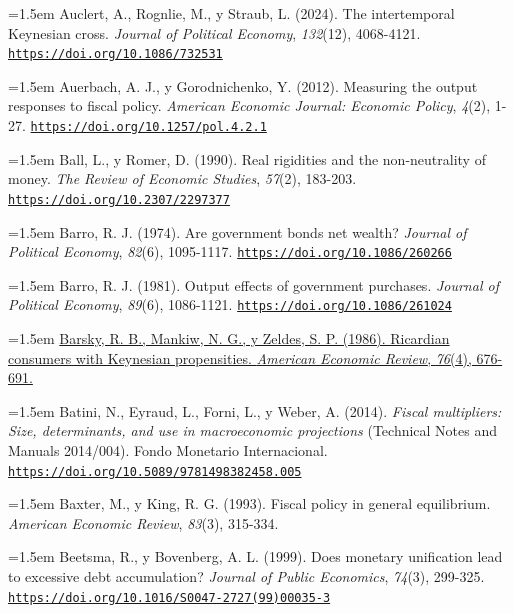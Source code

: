\documentclass[10pt,a4paper]{article}
\begin{document}
\noindent\hangindent=1.5em Auclert, A., Rognlie, M., y Straub, L. (2024). The intertemporal Keynesian cross. \textit{Journal of Political Economy}, \textit{132}(12), 4068-4121. \href{https://doi.org/10.1086/732531}{\nolinkurl{https://doi.org/10.1086/732531}}

\noindent\hangindent=1.5em Auerbach, A. J., y Gorodnichenko, Y. (2012). Measuring the output responses to fiscal policy. \textit{American Economic Journal: Economic Policy}, \textit{4}(2), 1-27. \href{https://doi.org/10.1257/pol.4.2.1}{\nolinkurl{https://doi.org/10.1257/pol.4.2.1}}

\noindent\hangindent=1.5em Ball, L., y Romer, D. (1990). Real rigidities and the non-neutrality of money. \textit{The Review of Economic Studies}, \textit{57}(2), 183-203. \href{https://doi.org/10.2307/2297377}{\nolinkurl{https://doi.org/10.2307/2297377}}

\noindent\hangindent=1.5em Barro, R. J. (1974). Are government bonds net wealth? \textit{Journal of Political Economy}, \textit{82}(6), 1095-1117. \href{https://doi.org/10.1086/260266}{\nolinkurl{https://doi.org/10.1086/260266}}

\noindent\hangindent=1.5em Barro, R. J. (1981). Output effects of government purchases. \textit{Journal of Political Economy}, \textit{89}(6), 1086-1121. \href{https://doi.org/10.1086/261024}{\nolinkurl{https://doi.org/10.1086/261024}}

\noindent\hangindent=1.5em \href{https://ideas.repec.org/a/aea/aecrev/v76y1986i4p676-91.html}{Barsky, R. B., Mankiw, N. G., y Zeldes, S. P. (1986). Ricardian consumers with Keynesian propensities. \textit{American Economic Review}, \textit{76}(4), 676-691.}

\noindent\hangindent=1.5em Batini, N., Eyraud, L., Forni, L., y Weber, A. (2014). \textit{Fiscal multipliers: Size, determinants, and use in macroeconomic projections} (Technical Notes and Manuals 2014/004). Fondo Monetario Internacional. \href{https://doi.org/10.5089/9781498382458.005}{\nolinkurl{https://doi.org/10.5089/9781498382458.005}}

\noindent\hangindent=1.5em Baxter, M., y King, R. G. (1993). Fiscal policy in general equilibrium. \textit{American Economic Review}, \textit{83}(3), 315-334.

\noindent\hangindent=1.5em Beetsma, R., y Bovenberg, A. L. (1999). Does monetary unification lead to excessive debt accumulation? \textit{Journal of Public Economics}, \textit{74}(3), 299-325. \href{https://doi.org/10.1016/S0047-2727(99)00035-3}{\nolinkurl{https://doi.org/10.1016/S0047-2727(99)00035-3}}
\end{document}
